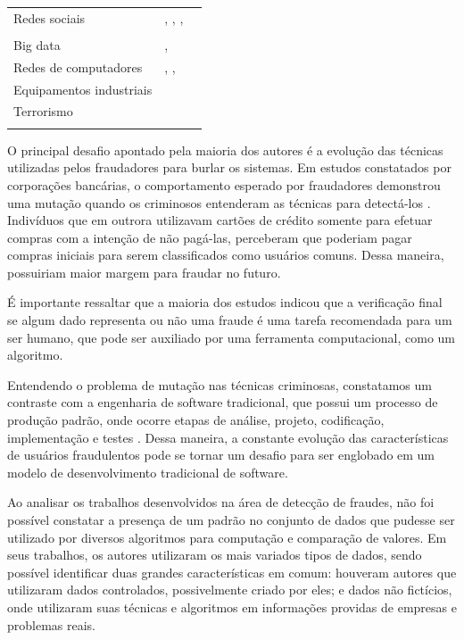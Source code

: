 \documentclass[smallextended]{svjour3}
\begin{document}
\begin{table}
\begin{tabular}[!Ht]{lll}
		Redes sociais & \cite{Yu2016}, \cite{Liu2015}, \cite{Feily2009},  &  \\
		& \cite{Rebahi2011} &  \\
		
		Big data & \cite{Sharma2015}, \cite{Mahmood2013} &  \\
		
		Redes de computadores & \cite{Allan2010}, \cite{Branco2016}, \cite{Akoglu2015}  &  \\
		
		Equipamentos industriais & \cite{Bauder2016} &  \\
		
		Terrorismo & \cite{Allan2010} &  \\
		\noalign{\smallskip}\hline
	\end{tabular}
\end{table}

O principal desafio apontado pela maioria dos autores é a evolução das técnicas utilizadas pelos fraudadores para burlar os sistemas. Em estudos constatados por corporações bancárias, o comportamento esperado por fraudadores demonstrou uma mutação quando os criminosos entenderam as técnicas para detectá-los \citep{Bolton2002}. Indivíduos que em outrora utilizavam cartões de crédito somente para efetuar compras com a intenção de não pagá-las, perceberam que poderiam pagar compras iniciais para serem classificados como usuários comuns. Dessa maneira, possuiriam maior margem para fraudar no futuro.

É importante ressaltar que a maioria dos estudos indicou que a verificação final se algum dado representa ou não uma fraude é uma tarefa recomendada para um ser humano, que pode ser auxiliado por uma ferramenta computacional, como um algoritmo. 

Entendendo o problema de mutação nas técnicas criminosas, constatamos um contraste com a engenharia de software tradicional, que possui um processo de produção padrão, onde ocorre etapas de análise, projeto, codificação, implementação e testes \citep{sommervillesoftware}. Dessa maneira, a constante evolução das características de usuários fraudulentos pode se tornar um desafio para ser englobado em um modelo de desenvolvimento tradicional de software. 

Ao analisar os trabalhos desenvolvidos na área de detecção de fraudes, não foi possível constatar a presença de um padrão no conjunto de dados que pudesse ser utilizado por diversos algoritmos para computação e comparação de valores. Em seus trabalhos, os autores utilizaram os mais variados tipos de dados, sendo possível identificar duas grandes características em comum: houveram autores que utilizaram dados controlados, possivelmente criado por eles; e dados não fictícios, onde utilizaram suas técnicas e algoritmos em informações providas de empresas e problemas reais. 
\end{document}
